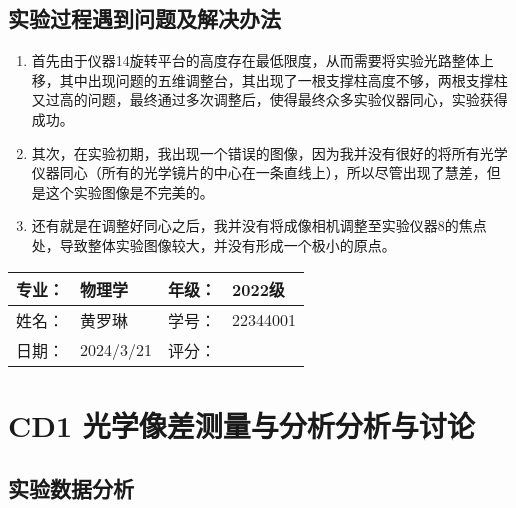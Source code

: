 \documentclass[dvipsnames, svgnames,a4paper,11pt]{article}
\begin{document}
	

	
	\subsection{实验过程遇到问题及解决办法}
	\begin{enumerate}
		\item 首先由于仪器14旋转平台的高度存在最低限度，从而需要将实验光路整体上移，其中出现问题的五维调整台，其出现了一根支撑柱高度不够，两根支撑柱又过高的问题，最终通过多次调整后，使得最终众多实验仪器同心，实验获得成功。
		\item 其次，在实验初期，我出现一个错误的图像，因为我并没有很好的将所有光学仪器同心（所有的光学镜片的中心在一条直线上），所以尽管出现了慧差，但是这个实验图像是不完美的。
		\item 还有就是在调整好同心之后，我并没有将成像相机调整至实验仪器8的焦点处，导致整体实验图像较大，并没有形成一个极小的原点。
		
		
		
	

	
	\end{enumerate}
	
	
	
	\clearpage
	
	\begin{table}
		\renewcommand\arraystretch{1.7}
		\begin{tabularx}{\textwidth}{|X|X|X|X|}
			\hline
			专业：& 物理学 &年级：& 2022级\\
			\hline
			姓名： &  黄罗琳& 学号：&22344001 \\
			\hline
			日期：& 2024/3/21 & 评分： &   \\
			\hline
		\end{tabularx}
	\end{table}
	
	\section{CD1 光学像差测量与分析\quad\heiti 分析与讨论}
	
	\subsection{实验数据分析}
	
\end{document}
